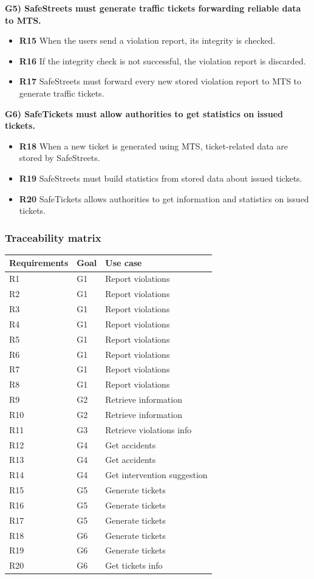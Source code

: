 \documentclass[a4paper]{article}
\begin{document}
\textbf{G5) SafeStreets must generate traffic tickets forwarding
reliable data to MTS.}

\begin{itemize}
\item
  \textbf{R15} When the users send a violation report, its integrity is
  checked.
\item
  \textbf{R16} If the integrity check is not successful, the violation
  report is discarded.
\item
  \textbf{R17} SafeStreets must forward every new stored violation
  report to MTS to generate traffic tickets.
\end{itemize}

\textbf{G6) SafeTickets must allow authorities to get statistics on
issued tickets.}

\begin{itemize}
\item
  \textbf{R18} When a new ticket is generated using MTS, ticket-related
  data are stored by SafeStreets.
\item
  \textbf{R19} SafeStreets must build statistics from stored data about
  issued tickets.
\item
  \textbf{R20} SafeTickets allows authorities to get information and
  statistics on issued tickets.
\end{itemize}

\subsubsection{Traceability matrix}

\begin{table}[H]
\centering
\begin{tabular}{|l|l|l|}
\hline
Requirements & Goal & Use case\tabularnewline
\hline
R1 & G1 & Report violations\tabularnewline
R2 & G1 & Report violations\tabularnewline
R3 & G1 & Report violations\tabularnewline
R4 & G1 & Report violations\tabularnewline
R5 & G1 & Report violations\tabularnewline
R6 & G1 & Report violations\tabularnewline
R7 & G1 & Report violations\tabularnewline
R8 & G1 & Report violations\tabularnewline
R9 & G2 & Retrieve information\tabularnewline
R10 & G2 & Retrieve information\tabularnewline
R11 & G3 & Retrieve violations info\tabularnewline
R12 & G4 & Get accidents\tabularnewline
R13 & G4 & Get accidents\tabularnewline
R14 & G4 & Get intervention suggestion\tabularnewline
R15 & G5 & Generate tickets\tabularnewline
R16 & G5 & Generate tickets\tabularnewline
R17 & G5 & Generate tickets\tabularnewline
R18 & G6 & Generate tickets\tabularnewline
R19 & G6 & Generate tickets\tabularnewline
R20 & G6 & Get tickets info\tabularnewline
\hline
\end{tabular}
\end{table}
\end{document}
